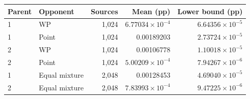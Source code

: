 \begin{tabular}{llrrr}
\toprule
Parent & Opponent & Sources & Mean (pp) & Lower bound (pp) \\
\midrule
1 & WP & 1,024 & $6.77034\times 10^{-4}$ & $6.64356\times 10^{-5}$ \\
1 & Point & 1,024 & 0.00189203 & $2.73724\times 10^{-5}$ \\
2 & WP & 1,024 & 0.00106778 & $1.10018\times 10^{-5}$ \\
2 & Point & 1,024 & $5.00209\times 10^{-4}$ & $7.94267\times 10^{-6}$ \\
\midrule
1 & Equal mixture & 2,048 & 0.00128453 & $4.69040\times 10^{-5}$ \\
2 & Equal mixture & 2,048 & $7.83993\times 10^{-4}$ & $9.47225\times 10^{-6}$ \\
\bottomrule
\end{tabular}
